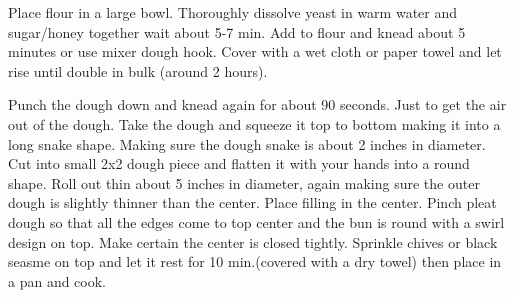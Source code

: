 
Place flour in a large bowl. Thoroughly dissolve yeast in warm water and sugar/honey together wait about 5-7 min. Add to flour and knead about 5 minutes or use mixer dough hook. Cover with a wet cloth or paper towel and let rise until double in bulk (around 2 hours). 

Punch the dough down and knead again for about 90 seconds. Just to get the air out of the dough. Take the dough and squeeze it top to bottom making it into a long snake shape. Making sure the dough snake is about 2 inches in diameter. Cut into small 2x2 dough piece and flatten it with your hands into a round shape. Roll out thin about 5 inches in diameter, again making sure the outer dough is slightly thinner than the center. Place filling in the center. Pinch pleat dough so that all the edges come to top center and the bun is round with a swirl design on top. Make certain the center is closed tightly. Sprinkle chives or black seasme on top and let it rest for 10 min.(covered with a dry towel) then place in a pan and cook. 